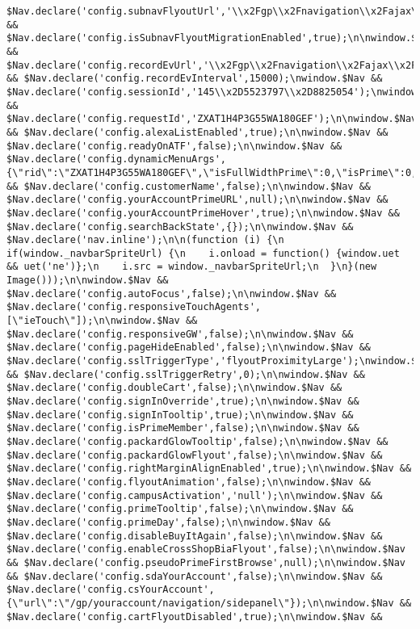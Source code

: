 \documentclass[
]{article}
\begin{document}
\begin{verbatim}
$Nav.declare('config.subnavFlyoutUrl','\\x2Fgp\\x2Fnavigation\\x2Fajax\\x2Fgeneric.html');\nwindow.$Nav && $Nav.declare('config.isSubnavFlyoutMigrationEnabled',true);\n\nwindow.$Nav && $Nav.declare('config.recordEvUrl','\\x2Fgp\\x2Fnavigation\\x2Fajax\\x2Frecordevent.html');\nwindow.$Nav && $Nav.declare('config.recordEvInterval',15000);\nwindow.$Nav && $Nav.declare('config.sessionId','145\\x2D5523797\\x2D8825054');\nwindow.$Nav && $Nav.declare('config.requestId','ZXAT1H4P3G55WA180GEF');\n\nwindow.$Nav && $Nav.declare('config.alexaListEnabled',true);\n\nwindow.$Nav && $Nav.declare('config.readyOnATF',false);\n\nwindow.$Nav && $Nav.declare('config.dynamicMenuArgs',{\"rid\":\"ZXAT1H4P3G55WA180GEF\",\"isFullWidthPrime\":0,\"isPrime\":0,\"dynamicRequest\":1,\"weblabs\":\"\",\"isFreshRegionAndCustomer\":\"\",\"primeMenuWidth\":310});\n\nwindow.$Nav && $Nav.declare('config.customerName',false);\n\nwindow.$Nav && $Nav.declare('config.yourAccountPrimeURL',null);\n\nwindow.$Nav && $Nav.declare('config.yourAccountPrimeHover',true);\n\nwindow.$Nav && $Nav.declare('config.searchBackState',{});\n\nwindow.$Nav && $Nav.declare('nav.inline');\n\n(function (i) {\n  if(window._navbarSpriteUrl) {\n    i.onload = function() {window.uet && uet('ne')};\n    i.src = window._navbarSpriteUrl;\n  }\n}(new Image()));\n\nwindow.$Nav && $Nav.declare('config.autoFocus',false);\n\nwindow.$Nav && $Nav.declare('config.responsiveTouchAgents',[\"ieTouch\"]);\n\nwindow.$Nav && $Nav.declare('config.responsiveGW',false);\n\nwindow.$Nav && $Nav.declare('config.pageHideEnabled',false);\n\nwindow.$Nav && $Nav.declare('config.sslTriggerType','flyoutProximityLarge');\nwindow.$Nav && $Nav.declare('config.sslTriggerRetry',0);\n\nwindow.$Nav && $Nav.declare('config.doubleCart',false);\n\nwindow.$Nav && $Nav.declare('config.signInOverride',true);\n\nwindow.$Nav && $Nav.declare('config.signInTooltip',true);\n\nwindow.$Nav && $Nav.declare('config.isPrimeMember',false);\n\nwindow.$Nav && $Nav.declare('config.packardGlowTooltip',false);\n\nwindow.$Nav && $Nav.declare('config.packardGlowFlyout',false);\n\nwindow.$Nav && $Nav.declare('config.rightMarginAlignEnabled',true);\n\nwindow.$Nav && $Nav.declare('config.flyoutAnimation',false);\n\nwindow.$Nav && $Nav.declare('config.campusActivation','null');\n\nwindow.$Nav && $Nav.declare('config.primeTooltip',false);\n\nwindow.$Nav && $Nav.declare('config.primeDay',false);\n\nwindow.$Nav && $Nav.declare('config.disableBuyItAgain',false);\n\nwindow.$Nav && $Nav.declare('config.enableCrossShopBiaFlyout',false);\n\nwindow.$Nav && $Nav.declare('config.pseudoPrimeFirstBrowse',null);\n\nwindow.$Nav && $Nav.declare('config.sdaYourAccount',false);\n\nwindow.$Nav && $Nav.declare('config.csYourAccount',{\"url\":\"/gp/youraccount/navigation/sidepanel\"});\n\nwindow.$Nav && $Nav.declare('config.cartFlyoutDisabled',true);\n\nwindow.$Nav && 
\end{verbatim}
\end{document}
